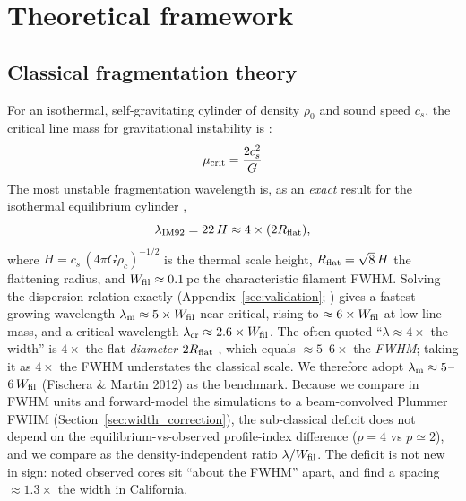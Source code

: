 \documentclass[usenatbib,twoside,twocolumn]{mnras}
\begin{document}
\section{Theoretical framework}
\label{sec:theory}

\subsection{Classical fragmentation theory}




For an isothermal, self-gravitating cylinder of density $\rho_0$ and sound speed $c_s$, the critical line mass for gravitational instability is \citep{Ostriker1964}:
\begin{equation}
\mu_{\rm crit} = \frac{2c_s^2}{G}
\label{eq:mucrit}
\end{equation}
The most unstable fragmentation wavelength is, as an \emph{exact} result for the isothermal equilibrium cylinder \citep{Inutsuka1992},
\begin{equation}
\lambda_{\rm IM92} = 22\,H \approx 4\times(2R_{\rm flat}),
\label{eq:lambdam}
\end{equation}
where $H = c_s\,(4\pi G\rho_c)^{-1/2}$ is the thermal scale height, $R_{\rm flat}=\sqrt8\,H$ the flattening radius, and $W_{\rm fil}\approx0.1$\,pc the characteristic filament FWHM. Solving the dispersion relation exactly (Appendix~\ref{sec:validation}; \citealt{Fischera2012}) gives a fastest-growing wavelength $\lambda_{\rm m}\approx5\times W_{\rm fil}$ near-critical, rising to $\approx6\times W_{\rm fil}$ at low line mass, and a critical wavelength $\lambda_{\rm cr}\approx2.6\times W_{\rm fil}$. The often-quoted ``$\lambda\approx4\times$ the width'' is $4\times$ the flat \emph{diameter} $2R_{\rm flat}$ \citep{Inutsuka1992}, which equals $\approx5$--$6\times$ the \emph{FWHM}; taking it as $4\times$ the FWHM understates the classical scale. We therefore adopt $\lambda_{\rm m}\approx5$--$6\,W_{\rm fil}$ (Fischera \& Martin 2012) as the benchmark. Because we compare in FWHM units and forward-model the simulations to a beam-convolved Plummer FWHM (Section~\ref{sec:width_correction}), the sub-classical deficit does not depend on the equilibrium-vs-observed profile-index difference ($p=4$ vs $p\simeq2$), and we compare as the density-independent ratio $\lambda/W_{\rm fil}$. The deficit is not new in sign: \citet{Fischera2012} noted observed cores sit ``about the FWHM'' apart, and \citet{Zhang2023cal} find a spacing $\approx1.3\times$ the width in California.
\end{document}

